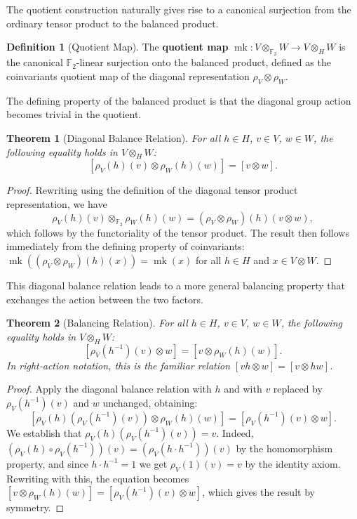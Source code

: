 \documentclass[11pt]{article}
\theoremstyle{plain}
\newtheorem*{theorem}{Theorem}
\theoremstyle{definition}
\newtheorem*{definition}{Definition}
\theoremstyle{remark}
\begin{document}
The quotient construction naturally gives rise to a canonical surjection from the ordinary tensor product to the balanced product.

\begin{definition}[Quotient Map]
The \textbf{quotient map} $\operatorname{mk} : V \otimes_{\mathbb{F}_2} W \to V \otimes_H W$ is the canonical $\mathbb{F}_2$-linear surjection onto the balanced product, defined as the coinvariants quotient map of the diagonal representation $\rho_V \otimes \rho_W$.
\end{definition}

The defining property of the balanced product is that the diagonal group action becomes trivial in the quotient.

\begin{theorem}[Diagonal Balance Relation]
For all $h \in H$, $v \in V$, $w \in W$, the following equality holds in $V \otimes_H W$:
\[
[\rho_V(h)(v) \otimes \rho_W(h)(w)] = [v \otimes w].
\]
\end{theorem}

\begin{proof}
Rewriting using the definition of the diagonal tensor product representation, we have
\[
\rho_V(h)(v) \otimes_{\mathbb{F}_2} \rho_W(h)(w) = (\rho_V \otimes \rho_W)(h)(v \otimes w),
\]
which follows by the functoriality of the tensor product. The result then follows immediately from the defining property of coinvariants: $\operatorname{mk}((\rho_V \otimes \rho_W)(h)(x)) = \operatorname{mk}(x)$ for all $h \in H$ and $x \in V \otimes W$.
\end{proof}

This diagonal balance relation leads to a more general balancing property that exchanges the action between the two factors.

\begin{theorem}[Balancing Relation]
For all $h \in H$, $v \in V$, $w \in W$, the following equality holds in $V \otimes_H W$:
\[
[\rho_V(h^{-1})(v) \otimes w] = [v \otimes \rho_W(h)(w)].
\]
In right-action notation, this is the familiar relation $[vh \otimes w] = [v \otimes hw]$.
\end{theorem}

\begin{proof}
Apply the diagonal balance relation with $h$ and with $v$ replaced by $\rho_V(h^{-1})(v)$ and $w$ unchanged, obtaining:
\[
[\rho_V(h)(\rho_V(h^{-1})(v)) \otimes \rho_W(h)(w)] = [\rho_V(h^{-1})(v) \otimes w].
\]
We establish that $\rho_V(h)(\rho_V(h^{-1})(v)) = v$. Indeed, $(\rho_V(h) \circ \rho_V(h^{-1}))(v) = (\rho_V(h \cdot h^{-1}))(v)$ by the homomorphism property, and since $h \cdot h^{-1} = 1$ we get $\rho_V(1)(v) = v$ by the identity axiom. Rewriting with this, the equation becomes $[v \otimes \rho_W(h)(w)] = [\rho_V(h^{-1})(v) \otimes w]$, which gives the result by symmetry.
\end{proof}
\end{document}
